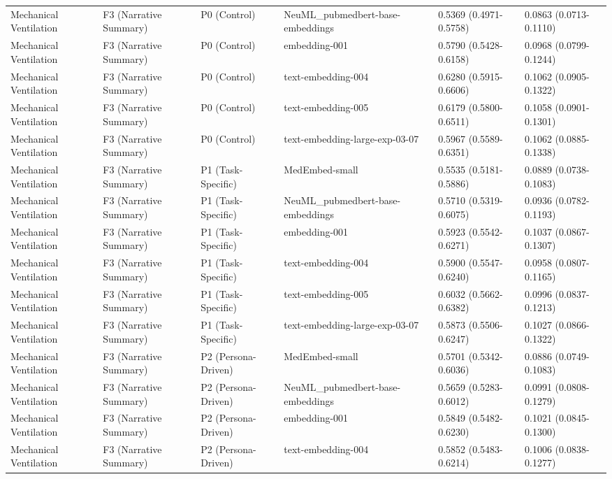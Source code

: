 \documentclass[border=0pt]{standalone}
\begin{document}
\begin{adjustbox}{width=\textwidth}
\begin{tabular}{llllll}
Mechanical Ventilation & F3 (Narrative Summary) & P0 (Control) & NeuML\_pubmedbert-base-embeddings & 0.5369 (0.4971-0.5758) & 0.0863 (0.0713-0.1110) \\
Mechanical Ventilation & F3 (Narrative Summary) & P0 (Control) & embedding-001 & 0.5790 (0.5428-0.6158) & 0.0968 (0.0799-0.1244) \\
Mechanical Ventilation & F3 (Narrative Summary) & P0 (Control) & text-embedding-004 & 0.6280 (0.5915-0.6606) & 0.1062 (0.0905-0.1322) \\
Mechanical Ventilation & F3 (Narrative Summary) & P0 (Control) & text-embedding-005 & 0.6179 (0.5800-0.6511) & 0.1058 (0.0901-0.1301) \\
Mechanical Ventilation & F3 (Narrative Summary) & P0 (Control) & text-embedding-large-exp-03-07 & 0.5967 (0.5589-0.6351) & 0.1062 (0.0885-0.1338) \\
Mechanical Ventilation & F3 (Narrative Summary) & P1 (Task-Specific) & MedEmbed-small & 0.5535 (0.5181-0.5886) & 0.0889 (0.0738-0.1083) \\
Mechanical Ventilation & F3 (Narrative Summary) & P1 (Task-Specific) & NeuML\_pubmedbert-base-embeddings & 0.5710 (0.5319-0.6075) & 0.0936 (0.0782-0.1193) \\
Mechanical Ventilation & F3 (Narrative Summary) & P1 (Task-Specific) & embedding-001 & 0.5923 (0.5542-0.6271) & 0.1037 (0.0867-0.1307) \\
Mechanical Ventilation & F3 (Narrative Summary) & P1 (Task-Specific) & text-embedding-004 & 0.5900 (0.5547-0.6240) & 0.0958 (0.0807-0.1165) \\
Mechanical Ventilation & F3 (Narrative Summary) & P1 (Task-Specific) & text-embedding-005 & 0.6032 (0.5662-0.6382) & 0.0996 (0.0837-0.1213) \\
Mechanical Ventilation & F3 (Narrative Summary) & P1 (Task-Specific) & text-embedding-large-exp-03-07 & 0.5873 (0.5506-0.6247) & 0.1027 (0.0866-0.1322) \\
Mechanical Ventilation & F3 (Narrative Summary) & P2 (Persona-Driven) & MedEmbed-small & 0.5701 (0.5342-0.6036) & 0.0886 (0.0749-0.1083) \\
Mechanical Ventilation & F3 (Narrative Summary) & P2 (Persona-Driven) & NeuML\_pubmedbert-base-embeddings & 0.5659 (0.5283-0.6012) & 0.0991 (0.0808-0.1279) \\
Mechanical Ventilation & F3 (Narrative Summary) & P2 (Persona-Driven) & embedding-001 & 0.5849 (0.5482-0.6230) & 0.1021 (0.0845-0.1300) \\
Mechanical Ventilation & F3 (Narrative Summary) & P2 (Persona-Driven) & text-embedding-004 & 0.5852 (0.5483-0.6214) & 0.1006 (0.0838-0.1277) \\

\end{tabular}
\end{adjustbox}
\end{document}
